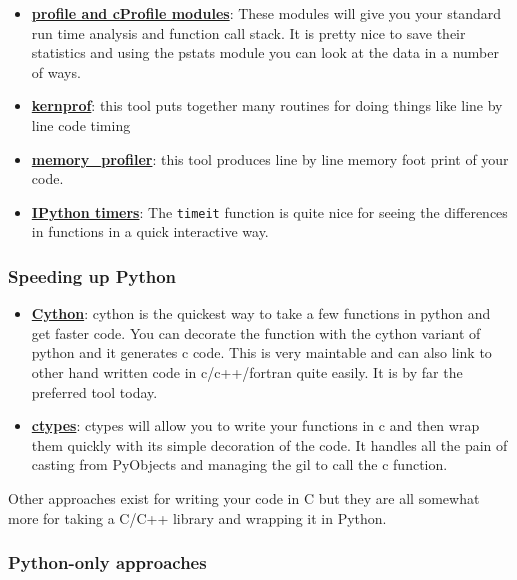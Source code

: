 \documentclass{article}
\begin{document}
\begin{itemize}
\item
  \textbf{\href{http://docs.python.org/library/profile.html}{profile and
  cProfile modules}}: These modules will give you your standard run time
  analysis and function call stack. It is pretty nice to save their
  statistics and using the pstats module you can look at the data in a
  number of ways.
\item
  \textbf{\href{http://packages.python.org/line_profiler/}{kernprof}}:
  this tool puts together many routines for doing things like line by
  line code timing
\item
  \textbf{\href{http://pypi.python.org/pypi/memory_profiler}{memory\_profiler}}:
  this tool produces line by line memory foot print of your code.
\item
  \textbf{\href{http://ipython.org/ipython-doc/dev/interactive/tutorial.html\#magic-functions}{IPython
  timers}}: The \texttt{timeit} function is quite nice for seeing the
  differences in functions in a quick interactive way.
\end{itemize}

\subsubsection{Speeding up Python}\label{speeding-up-python}

\begin{itemize}
\item
  \textbf{\href{http://cython.org/}{Cython}}: cython is the quickest way
  to take a few functions in python and get faster code. You can
  decorate the function with the cython variant of python and it
  generates c code. This is very maintable and can also link to other
  hand written code in c/c++/fortran quite easily. It is by far the
  preferred tool today.
\item
  \textbf{\href{http://docs.python.org/library/ctypes.html}{ctypes}}:
  ctypes will allow you to write your functions in c and then wrap them
  quickly with its simple decoration of the code. It handles all the
  pain of casting from PyObjects and managing the gil to call the c
  function.
\end{itemize}

Other approaches exist for writing your code in C but they are all
somewhat more for taking a C/C++ library and wrapping it in Python.

\subsubsection{Python-only approaches}\label{python-only-approaches}
\end{document}
